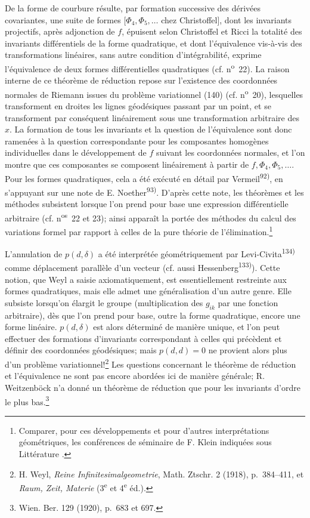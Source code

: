\documentclass[11pt]{article}
\begin{document}
De la forme de courbure résulte, par formation successive des dérivées covariantes, une suite de formes $[\Phi_4,\Phi_5,\ldots$ chez Christoffel], dont les invariants projectifs, après adjonction de $f$, épuisent selon Christoffel et Ricci la totalité des invariants différentiels de la forme quadratique, et dont l'équivalence vis-à-vis des transformations linéaires, sans autre condition d'intégrabilité, exprime l'équivalence de deux formes différentielles quadratiques (cf. n\textsuperscript{o}~22). La raison interne de ce théorème de réduction repose sur l'existence des coordonnées normales de Riemann issues du problème variationnel (140) (cf. n\textsuperscript{o}~20), lesquelles transforment en droites les lignes géodésiques passant par un point, et se transforment par conséquent linéairement sous une transformation arbitraire des $x$. La formation de tous les invariants et la question de l'équivalence sont donc ramenées à la question correspondante pour les composantes homogènes individuelles dans le développement de $f$ suivant les coordonnées normales, et l'on montre que ces composantes se composent linéairement à partir de $f,\Phi_4,\Phi_5,\ldots$. Pour les formes quadratiques, cela a été exécuté en détail par Vermeil\textsuperscript{92)}, en s'appuyant sur une note de E. Noether\textsuperscript{93)}. D'après cette note, les théorèmes et les méthodes subsistent lorsque l'on prend pour base une expression différentielle arbitraire (cf. n\textsuperscript{os}~22 et 23); ainsi apparaît la portée des méthodes du calcul des variations formel par rapport à celles de la pure théorie de l'élimination.\footnote{Comparer, pour ces développements et pour d'autres interprétations géométriques, les conférences de séminaire de F. Klein indiquées sous \og Littérature \fg{}.}

L'annulation de $p(d,\delta)$ a été interprétée géométriquement par Levi-Civita\textsuperscript{134)} comme \og déplacement parallèle d'un vecteur \fg{} (cf. aussi Hessenberg\textsuperscript{133)}). Cette notion, que Weyl a saisie axiomatiquement, est essentiellement restreinte aux formes quadratiques, mais elle admet une généralisation d'un autre genre. Elle subsiste lorsqu'on élargit le groupe (multiplication des $g_{ik}$ par une fonction arbitraire), dès que l'on prend pour base, outre la forme quadratique, encore une forme linéaire. $p(d,\delta)$ est alors déterminé de manière unique, et l'on peut effectuer des formations d'invariants correspondant à celles qui précèdent et définir des coordonnées géodésiques; mais $p(d,d)=0$ ne provient alors plus d'un problème variationnel!\footnote{H. Weyl, \emph{Reine Infinitesimalgeometrie}, Math. Ztschr. 2 (1918), p.~384--411, et \emph{Raum, Zeit, Materie} (3\textsuperscript{e} et 4\textsuperscript{e} éd.).} Les questions concernant le théorème de réduction et l'équivalence ne sont pas encore abordées ici de manière générale; R. Weitzenböck n'a donné un théorème de réduction que pour les invariants d'ordre le plus bas.\footnote{Wien. Ber. 129 (1920), p.~683 et 697.}
\end{document}
